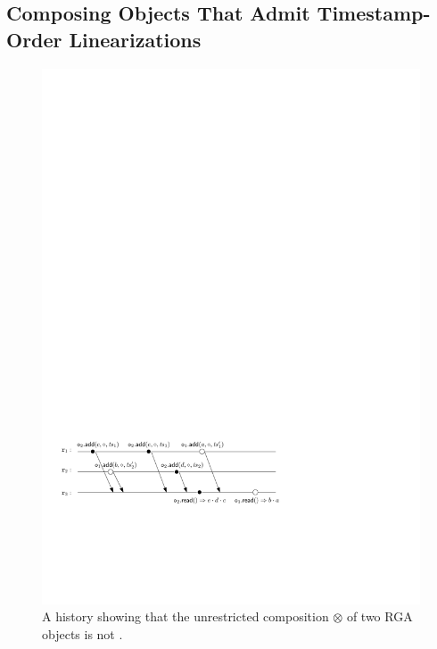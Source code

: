 \subsection{Composing Objects That Admit Timestamp-Order Linearizations}

%

\begin{figure}[t]
  \centering
  \includegraphics[width=0.7 \textwidth]{figures/LWWReg-LWWReg-NoSTS.pdf}
  \caption{A history showing that the unrestricted composition $\otimes$ of two RGA objects is not \crdtlinearizable{}.
  }
  \label{fig:negative_ts_composition}
\end{figure}


